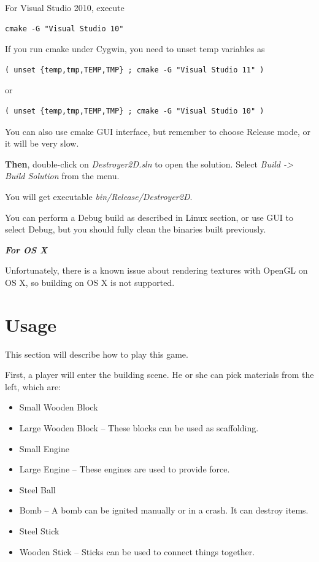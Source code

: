 \documentclass[UTF8]{ctexart}
\begin{document}
            For Visual Studio 2010, execute

            \begin{verbatim}cmake -G "Visual Studio 10" \end{verbatim}

            If you run cmake under Cygwin, you need to unset temp variables as

            \begin{verbatim}( unset {temp,tmp,TEMP,TMP} ; cmake -G "Visual Studio 11" ) \end{verbatim}

            or

            \begin{verbatim}( unset {temp,tmp,TEMP,TMP} ; cmake -G "Visual Studio 10" ) \end{verbatim}

            You can also use cmake GUI interface, but remember to choose Release mode, or it will be very slow.

            \textbf{Then}, double-click on \textit{Destroyer2D.sln} to open the solution. Select \textit{Build -> Build Solution} from the menu.

            You will get executable \textit{bin/Release/Destroyer2D}.

            You can perform a Debug build as described in Linux section, or use GUI to select Debug, but you should fully clean the binaries built previously.

            \noindent \textbf{\textit{For OS X}}

            Unfortunately, there is a known issue about rendering textures with OpenGL on OS X, so building on OS X is not supported.

    \section{Usage}

        This section will describe how to play this game.

        First, a player will enter the building scene. He or she can pick materials from the left, which are:

        \begin{itemize}
            \item Small Wooden Block
            \item Large Wooden Block -- These blocks can be used as scaffolding.
            \item Small Engine
            \item Large Engine -- These engines are used to provide force.
            \item Steel Ball
            \item Bomb -- A bomb can be ignited manually or in a crash. It can destroy items.
            \item Steel Stick
            \item Wooden Stick -- Sticks can be used to connect things together.
        \end{itemize}
\end{document}
